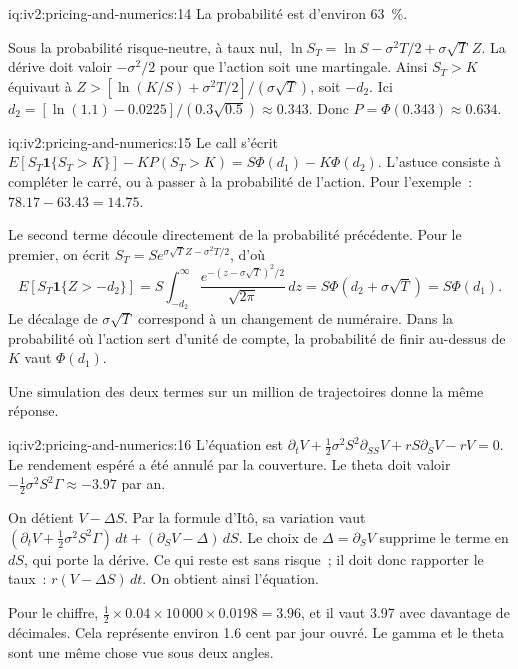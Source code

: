 \begin{solution}{iq:iv2:pricing-and-numerics:14}
La probabilité est d'environ 63~\%.

Sous la probabilité risque-neutre, à taux nul, $\ln S_T = \ln S - \sigma^2T/2 + \sigma\sqrt T\,Z$. La dérive doit valoir $-\sigma^2/2$ pour que l'action soit une martingale. Ainsi $S_T > K$ équivaut à $Z > [\ln(K/S) + \sigma^2T/2]/(\sigma\sqrt T)$, soit $-d_2$. Ici $d_2 = [\ln(1.1) - 0.0225]/(0.3\sqrt{0.5}) \approx 0.343$. Donc $P = \Phi(0.343) \approx 0.634$.

\end{solution}

\begin{solution}{iq:iv2:pricing-and-numerics:15}
Le call s'écrit $E[S_T\mathbf 1\{S_T > K\}] - KP(S_T > K) = S\Phi(d_1) - K\Phi(d_2)$. L'astuce consiste à compléter le carré, ou à passer à la probabilité de l'action. Pour l'exemple~: $78.17 - 63.43 = 14.75$.

Le second terme découle directement de la probabilité précédente. Pour le premier, on écrit $S_T = Se^{\sigma\sqrt T Z - \sigma^2T/2}$, d'où
\[
E[S_T\mathbf 1\{Z > -d_2\}] = S\int_{-d_2}^\infty \frac{e^{-(z - \sigma\sqrt T)^2/2}}{\sqrt{2\pi}}\,dz = S\Phi(d_2 + \sigma\sqrt T) = S\Phi(d_1).
\]
Le décalage de $\sigma\sqrt T$ correspond à un changement de numéraire. Dans la probabilité où l'action sert d'unité de compte, la probabilité de finir au-dessus de $K$ vaut $\Phi(d_1)$.

Une simulation des deux termes sur un million de trajectoires donne la même réponse.

\end{solution}

\begin{solution}{iq:iv2:pricing-and-numerics:16}
L'équation est $\partial_tV + \tfrac12\sigma^2S^2\partial_{SS}V + rS\partial_SV - rV = 0$. Le rendement espéré a été annulé par la couverture. Le theta doit valoir $-\tfrac12\sigma^2S^2\Gamma \approx -3.97$ par an.

On détient $V - \Delta S$. Par la formule d'Itô, sa variation vaut $(\partial_tV + \tfrac12\sigma^2S^2\Gamma)\,dt + (\partial_SV - \Delta)\,dS$. Le choix de $\Delta = \partial_SV$ supprime le terme en $dS$, qui porte la dérive. Ce qui reste est sans risque~; il doit donc rapporter le taux~: $r(V - \Delta S)\,dt$. On obtient ainsi l'équation.

Pour le chiffre, $\tfrac12 \times 0.04 \times 10\,000 \times 0.0198 = 3.96$, et il vaut 3.97 avec davantage de décimales. Cela représente environ 1.6 cent par jour ouvré. Le gamma et le theta sont une même chose vue sous deux angles.

\end{solution}

